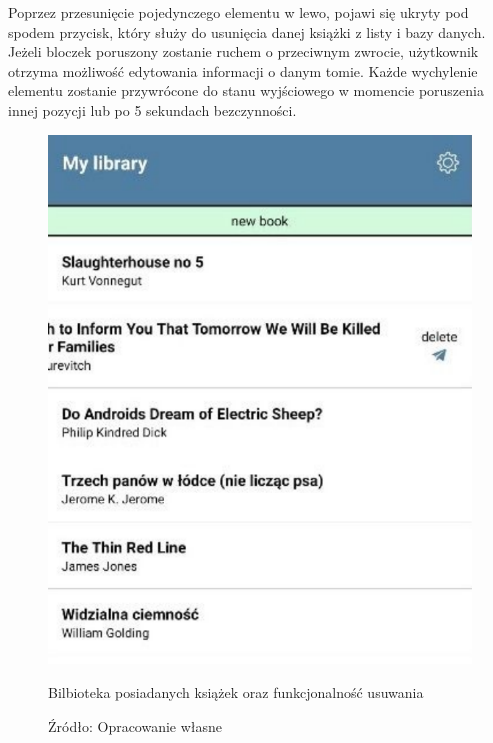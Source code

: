 Poprzez przesunięcie pojedynczego elementu w lewo, pojawi się ukryty pod spodem przycisk, który służy do usunięcia danej książki z listy i bazy danych. Jeżeli bloczek poruszony zostanie ruchem o przeciwnym zwrocie, użytkownik otrzyma możliwość edytowania informacji o danym tomie.
Każde wychylenie elementu zostanie przywrócone do stanu wyjściowego w momencie poruszenia innej pozycji lub po 5 sekundach bezczynności.
\begin{figure}[H]
	\centering
	\includegraphics{mylib.pdf}
	\caption{\centering Bilbioteka posiadanych książek oraz funkcjonalność usuwania}
	\caption*{\centering Źródło: {Opracowanie własne}}
\end{figure}


